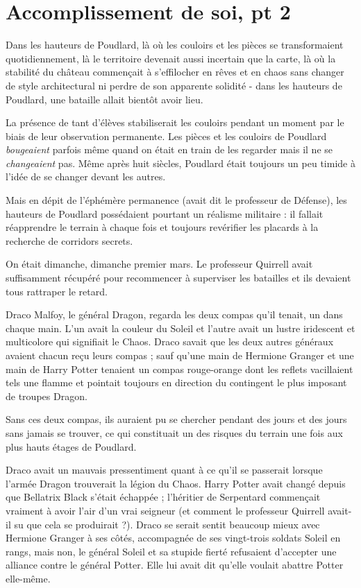 
\chapter{Accomplissement de soi, pt 2}

Dans les hauteurs de Poudlard, là où les couloirs et les pièces se transformaient quotidiennement, là le territoire devenait aussi incertain que la carte, là où la stabilité du château commençait à s'effilocher en rêves et en chaos sans changer de style architectural ni perdre de son apparente solidité - dans les hauteurs de Poudlard, une bataille allait bientôt avoir lieu.

La présence de tant d'élèves stabiliserait les couloirs pendant un moment par le biais de leur observation permanente. Les pièces et les couloirs de Poudlard \emph{bougeaient}  parfois même quand on était en train de les regarder mais il ne se \emph{changeaient } pas. Même après huit siècles, Poudlard était toujours un peu timide à l'idée de se changer devant les autres.

Mais en dépit de l'éphémère permanence (avait dit le professeur de Défense), les hauteurs de Poudlard possédaient pourtant un réalisme militaire : il fallait réapprendre le terrain à chaque fois et toujours revérifier les placards à la recherche de corridors secrets.

On était dimanche, dimanche premier mars. Le professeur Quirrell avait suffisamment récupéré pour recommencer à superviser les batailles et ils devaient tous rattraper le retard.

Draco Malfoy, le général Dragon, regarda les deux compas qu'il tenait, un dans chaque main. L'un avait la couleur du Soleil et l'autre avait un lustre iridescent et multicolore qui signifiait le Chaos. Draco savait que les deux autres généraux avaient chacun reçu leurs compas ; sauf qu'une main de Hermione Granger et une main de Harry Potter tenaient un compas rouge-orange dont les reflets vacillaient tels une flamme et pointait toujours en direction du contingent le plus imposant de troupes Dragon.

Sans ces deux compas, ils auraient pu se chercher pendant des jours et des jours sans jamais se trouver, ce qui constituait un des risques du terrain une fois aux plus hauts étages de Poudlard.

Draco avait un mauvais pressentiment quant à ce qu'il se passerait lorsque l'armée Dragon trouverait la légion du Chaos. Harry Potter avait changé depuis que Bellatrix Black s'était échappée ; l'héritier de Serpentard commençait vraiment à avoir l'air d'un vrai seigneur (et comment le professeur Quirrell avait-il su que cela se produirait ?). Draco se serait sentit beaucoup mieux avec Hermione Granger à ses côtés, accompagnée de ses vingt-trois soldats Soleil en rangs, mais non, le général Soleil et sa stupide fierté refusaient d'accepter une alliance contre le général Potter. Elle lui avait dit qu'elle voulait abattre Potter elle-même.


